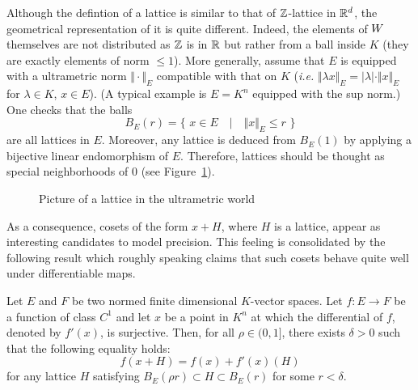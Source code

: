\documentclass{article}
\begin{document}
Although the defintion of a lattice is similar to that of $\mathbb Z$-lattice 
in $\mathbb R^d$, the geometrical representation of it is quite different. 
Indeed, the elements of $W$ themselves are not distributed as $\mathbb Z$ is 
in $\mathbb R$ but rather from a ball inside $K$ (they are exactly elements of 
norm $\leq 1$). More 
generally, assume that $E$ is equipped with a ultrametric norm $\Vert 
\cdot \Vert_E$ compatible with that on $K$ (\emph{i.e.} $\Vert \lambda x 
\Vert_E = |\lambda| \cdot \Vert x \Vert_E$ for $\lambda \in K$, $x \in 
E$). (A typical example is $E = K^n$ equipped with the sup norm.) One
checks that the balls
$$B_E(r) = \big\{ \,\, x \in E \quad\big|\quad \Vert x \Vert_E \leq r \,\,\big\}$$
are all lattices in $E$. Moreover, any lattice is deduced from $B_E(1)$ 
by applying a bijective linear endomorphism of $E$. Therefore, lattices 
should be thought as special neighborhoods of $0$ (see Figure~\ref{fig:lattice}).
%
\begin{figure}
\hfill
{}
\hfill \null

\caption{Picture of a lattice in the ultrametric world}
\label{fig:lattice}
\end{figure}
%
As a consequence, cosets of the form $x + H$, where $H$ is a lattice, 
appear as interesting candidates to model precision. This feeling is 
consolidated by the following result which roughly speaking claims that 
such cosets behave quite well under differentiable maps.

\begin{lem}
\label{lem:padicprec}
Let $E$ and $F$ be two normed finite dimensional $K$-vector spaces.
Let $f : E \to F$ be a function of class $C^1$ and let $x$
be a point in $K^n$ at which the differential of $f$, denoted by
$f'(x)$, is surjective.
Then, for all $\rho \in (0,1]$, there exists $\delta > 0$ such that
the following equality holds:
\begin{equation}
\label{eq:padicprec}
f(x + H) = f(x) + f'(x)(H)
\end{equation}
for any lattice $H$ satisfying $B_E(\rho r) \subset H \subset B_E(r)$
for some $r < \delta$.
\end{lem}
\end{document}
